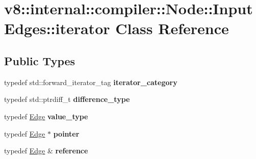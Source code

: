 \hypertarget{classv8_1_1internal_1_1compiler_1_1Node_1_1InputEdges_1_1iterator}{}\section{v8\+:\+:internal\+:\+:compiler\+:\+:Node\+:\+:Input\+Edges\+:\+:iterator Class Reference}
\label{classv8_1_1internal_1_1compiler_1_1Node_1_1InputEdges_1_1iterator}
\subsection*{Public Types}
\begin{DoxyCompactItemize}
\item 
\mbox{\label{classv8_1_1internal_1_1compiler_1_1Node_1_1InputEdges_1_1iterator_aec48fd6b4681a7ecfb55d78294d55892}} 
typedef std\+::forward\+\_\+iterator\+\_\+tag {\bfseries iterator\+\_\+category}
\item 
\mbox{\label{classv8_1_1internal_1_1compiler_1_1Node_1_1InputEdges_1_1iterator_a1806e987b0d04d38486c890b84a9b874}} 
typedef std\+::ptrdiff\+\_\+t {\bfseries difference\+\_\+type}
\item 
\mbox{\label{classv8_1_1internal_1_1compiler_1_1Node_1_1InputEdges_1_1iterator_a7ef237b8729f2c95e3aaa786203f0de8}} 
typedef \mbox{\hyperlink{classv8_1_1internal_1_1compiler_1_1Edge}{Edge}} {\bfseries value\+\_\+type}
\item 
\mbox{\label{classv8_1_1internal_1_1compiler_1_1Node_1_1InputEdges_1_1iterator_a504075c26d62de4d4d5cd9ab07c2cc08}} 
typedef \mbox{\hyperlink{classv8_1_1internal_1_1compiler_1_1Edge}{Edge}} $\ast$ {\bfseries pointer}
\item 
\mbox{\label{classv8_1_1internal_1_1compiler_1_1Node_1_1InputEdges_1_1iterator_aa5ccd077802a451cd5aaf4ff4f13f264}} 
typedef \mbox{\hyperlink{classv8_1_1internal_1_1compiler_1_1Edge}{Edge}} \& {\bfseries reference}
\end{DoxyCompactItemize}
